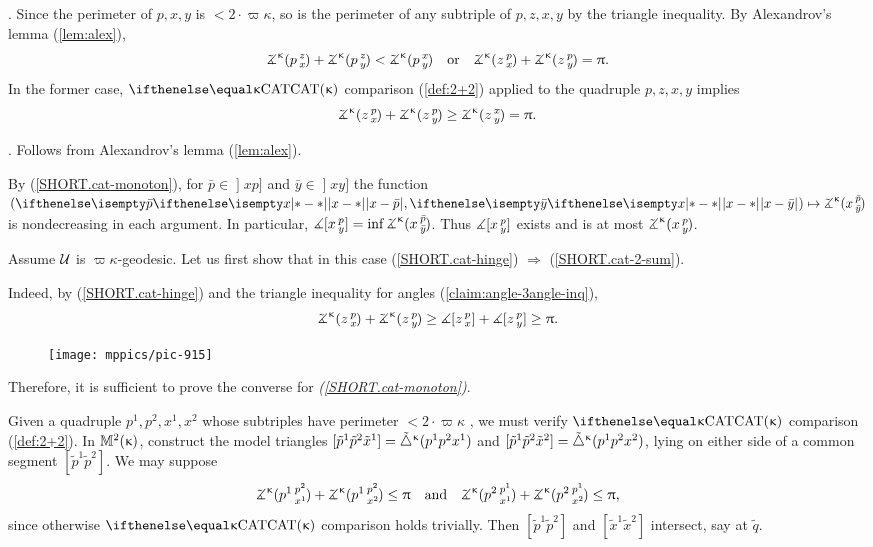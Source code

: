 . 
Since the perimeter of $p,x,y$ is $<2\cdot \varpi\kappa$, so is the perimeter of any subtriple of $p,z,x,y$ by the triangle inequality. 
By Alexandrov's lemma (\ref{lem:alex}), 
\[\angk\kappa p z x +\angk\kappa p z y  < \angk{\kappa} p x y \quad \text{or}\quad  \angk\kappa z p x  +\angk\kappa z p y  =\pi.\]
In the former case, $\CAT\kappa$ comparison (\ref{def:2+2}) applied to the quadruple $p, z, x, y$ implies
\[\angk\kappa z p x  +\angk\kappa z p y  \ge \angk{\kappa} z x y =\pi.\]

\parit{(\ref{SHORT.cat-2-sum}) $\Leftrightarrow$ (\ref{SHORT.cat-monoton})}. Follows from  Alexandrov's lemma (\ref{lem:alex}).

By (\ref{SHORT.cat-monoton}), for $\bar p\in\mathopen{]}x p]$ and $\bar y\in\mathopen{]}x y]$ the function $(\dist{x}{\bar p}{},\dist{x}{\bar y}{})\mapsto\angk\kappa x{\bar p}{\bar y}$ is nondecreasing in each argument.
In particular, 
$\mangle\hinge x p y\z=\inf\angk\kappa x{\bar p}{\bar y}$.
Thus $\measuredangle[x\,{}^{p}_{y}]$ exists and is
at most $\angk\kappa x p y$. 

 Assume $\mathcal{U}$ is $\varpi\kappa$-geodesic. 
Let us first show that in this case (\ref{SHORT.cat-hinge}) $\Rightarrow$ (\ref{SHORT.cat-2-sum}).

Indeed, by (\ref{SHORT.cat-hinge}) and the triangle inequality for angles (\ref{claim:angle-3angle-inq}),
\[\angk\kappa z p x
+\angk\kappa z p y \ge \mangle\hinge z p x
+\mangle\hinge z p y \ge \pi.\]

\begin{wrapfigure}{r}{30 mm}
\vskip-0mm
\centering
\texttt{[image: mppics/pic-915]}
\end{wrapfigure}

Therefore, it is sufficient to prove the converse for \textit{(\ref{SHORT.cat-monoton})}.

Given a quadruple  $p^1,p^2,x^1,x^2$ whose subtriples have perimeter $<2\cdot\varpi\kappa$ , we must verify $\CAT\kappa$ comparison (\ref{def:2+2}).
In $\mathbb{M}_{{}}^{2}({\upkappa})$, construct the model triangles  $[{\tilde p^1}{\tilde p^2}{\tilde x^1}] = {\tilde\triangle}^{\upkappa}(p^1 p^2 x^1 )$ 
and $\trig{\tilde p^1}{\tilde p^2}{\tilde x^2}\z= \modtrig\kappa(p^1 p^2 x^2)$, lying on either side of a common segment $[\tilde p^1 \tilde p^2]$.
We may suppose 
\[\angk{\kappa} {p^1}{p^2}{x^1}+\angk{\kappa} {p^1}{p^2}{x^2}
\le
\pi
\quad \text{and}\quad 
\angk{\kappa}{p^2}{p^1}{x^1}+\angk{\kappa} {p^2}{p^1}{x^2}
\le 
\pi,\] 
since otherwise $\CAT\kappa$ comparison holds trivially.  
Then $[\tilde p^1 \tilde p^2]$ and $[\tilde x^1 \tilde x^2]$ intersect, say at $\tilde q$.  

